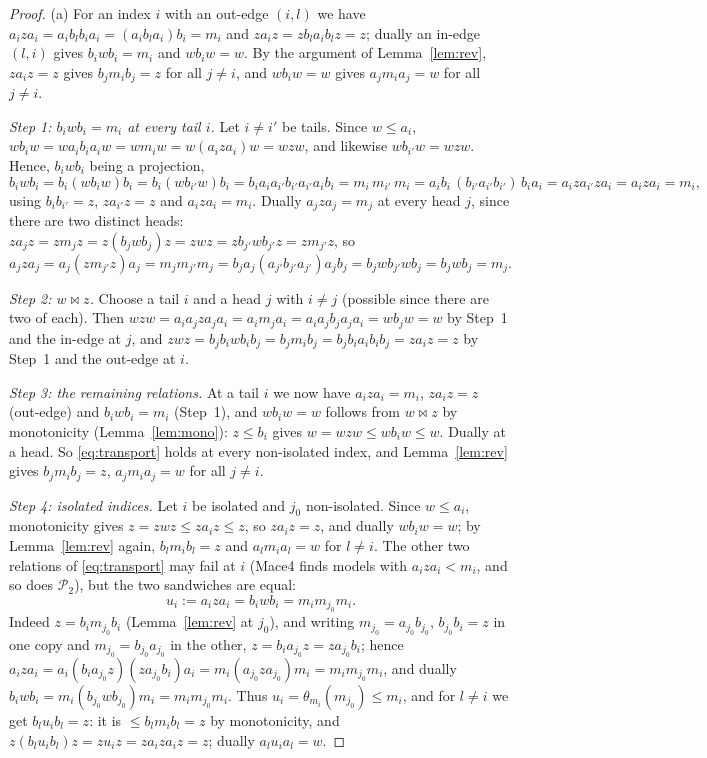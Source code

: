 \documentclass[11pt]{amsart}
\theoremstyle{definition}
\renewcommand{\P}{\mathcal{P}}
\newcommand{\mt}{\bowtie}   %
\begin{document}
\begin{proof}
(a) For an index $i$ with an out-edge $(i,l)$ we have $a_iza_i=a_ib_lb_ia_i=(a_ib_la_i)b_i=m_i$ and $za_iz=zb_la_ib_lz=z$; dually an in-edge $(l,i)$ gives $b_iwb_i=m_i$ and $wb_iw=w$. By the argument of Lemma~\ref{lem:rev}, $za_iz=z$ gives $b_jm_ib_j=z$ for all $j\ne i$, and $wb_iw=w$ gives $a_jm_ia_j=w$ for all $j\ne i$.

\emph{Step 1: $b_iwb_i=m_i$ at every tail $i$.} Let $i\ne i'$ be tails. Since $w\le a_i$, $wb_iw=wa_ib_ia_iw=wm_iw=w(a_iza_i)w=wzw$, and likewise $wb_{i'}w=wzw$. Hence, $b_iwb_i$ being a projection,
\[
b_iwb_i=b_i(wb_iw)b_i=b_i(wb_{i'}w)b_i=b_ia_ia_{i'}b_{i'}a_{i'}a_ib_i=m_i\,m_{i'}\,m_i=a_ib_i\,(b_{i'}a_{i'}b_{i'})\,b_ia_i=a_iza_{i'}za_i=a_iza_i=m_i ,
\]
using $b_ib_{i'}=z$, $za_{i'}z=z$ and $a_iza_i=m_i$. Dually $a_jza_j=m_j$ at every head $j$, since there are two distinct heads: $za_jz=zm_jz=z(b_jwb_j)z=zwz=zb_{j'}wb_{j'}z=zm_{j'}z$, so $a_jza_j=a_j(zm_{j'}z)a_j=m_jm_{j'}m_j=b_ja_j(a_{j'}b_{j'}a_{j'})a_jb_j=b_jwb_{j'}wb_j=b_jwb_j=m_j$.

\emph{Step 2: $w\mt z$.} Choose a tail $i$ and a head $j$ with $i\ne j$ (possible since there are two of each). Then $wzw=a_ia_jza_ja_i=a_im_ja_i=a_ia_jb_ja_ja_i=wb_jw=w$ by Step~1 and the in-edge at $j$, and $zwz=b_jb_iwb_ib_j=b_jm_ib_j=b_jb_ia_ib_ib_j=za_iz=z$ by Step~1 and the out-edge at $i$.

\emph{Step 3: the remaining relations.} At a tail $i$ we now have $a_iza_i=m_i$, $za_iz=z$ (out-edge) and $b_iwb_i=m_i$ (Step~1), and $wb_iw=w$ follows from $w\mt z$ by monotonicity (Lemma~\ref{lem:mono}): $z\le b_i$ gives $w=wzw\le wb_iw\le w$. Dually at a head. So \eqref{eq:transport} holds at every non-isolated index, and Lemma~\ref{lem:rev} gives $b_jm_ib_j=z$, $a_jm_ia_j=w$ for all $j\ne i$.

\emph{Step 4: isolated indices.} Let $i$ be isolated and $j_0$ non-isolated. Since $w\le a_i$, monotonicity gives $z=zwz\le za_iz\le z$, so $za_iz=z$, and dually $wb_iw=w$; by Lemma~\ref{lem:rev} again, $b_lm_ib_l=z$ and $a_lm_ia_l=w$ for $l\ne i$. The other two relations of \eqref{eq:transport} may fail at $i$ (Mace4 finds models with $a_iza_i<m_i$, and so does $\P_2$), but the two sandwiches are equal:
\[
u_i:=a_iza_i=b_iwb_i=m_im_{j_0}m_i .
\]
Indeed $z=b_im_{j_0}b_i$ (Lemma~\ref{lem:rev} at $j_0$), and writing $m_{j_0}=a_{j_0}b_{j_0}$, $b_{j_0}b_i=z$ in one copy and $m_{j_0}=b_{j_0}a_{j_0}$ in the other, $z=b_ia_{j_0}z=za_{j_0}b_i$; hence $a_iza_i=a_i(b_ia_{j_0}z)(za_{j_0}b_i)a_i=m_i(a_{j_0}za_{j_0})m_i=m_im_{j_0}m_i$, and dually $b_iwb_i=m_i(b_{j_0}wb_{j_0})m_i=m_im_{j_0}m_i$. Thus $u_i=\theta_{m_i}(m_{j_0})\le m_i$, and for $l\ne i$ we get $b_lu_ib_l=z$: it is $\le b_lm_ib_l=z$ by monotonicity, and $z(b_lu_ib_l)z=zu_iz=za_iza_iz=z$; dually $a_lu_ia_l=w$.


\end{proof}
\end{document}
